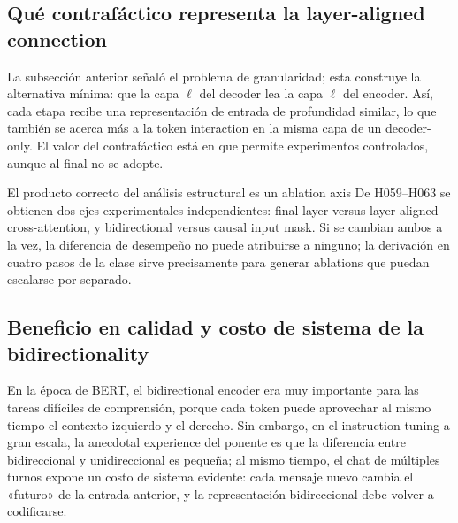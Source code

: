 
\subsection{Qué contrafáctico representa la layer-aligned connection}

La subsección anterior señaló el problema de granularidad; esta construye la alternativa mínima: que la capa $\ell$ del decoder lea la capa $\ell$ del encoder. Así, cada etapa recibe una representación de entrada de profundidad similar, lo que también se acerca más a la token interaction en la misma capa de un decoder-only. El valor del contrafáctico está en que permite experimentos controlados, aunque al final no se adopte.



\begin{importantbox}{El producto correcto del análisis estructural es un ablation axis}
De H059--H063 se obtienen dos ejes experimentales independientes: final-layer versus layer-aligned cross-attention, y bidirectional versus causal input mask. Si se cambian ambos a la vez, la diferencia de desempeño no puede atribuirse a ninguno; la derivación en cuatro pasos de la clase sirve precisamente para generar ablations que puedan escalarse por separado.
\end{importantbox}

\subsection{Beneficio en calidad y costo de sistema de la bidirectionality}

En la época de BERT, el bidirectional encoder era muy importante para las tareas difíciles de comprensión, porque cada token puede aprovechar al mismo tiempo el contexto izquierdo y el derecho. Sin embargo, en el instruction tuning a gran escala, la anecdotal experience del ponente es que la diferencia entre bidireccional y unidireccional es pequeña; al mismo tiempo, el chat de múltiples turnos expone un costo de sistema evidente: cada mensaje nuevo cambia el «futuro» de la entrada anterior, y la representación bidireccional debe volver a codificarse.

